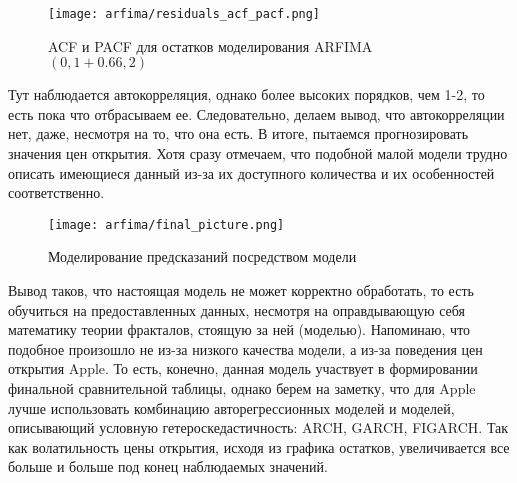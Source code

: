 \begin{enumerate}
	\begin{figure}[H]
		\centering
		\texttt{[image: arfima/residuals\_acf\_pacf.png]}
		\caption{ACF и PACF для остатков моделирования ARFIMA$(0, 1 + 0.66, 2)$}
	\end{figure} 
	\noindent Тут наблюдается автокорреляция, однако более высоких порядков, чем 1-2, то есть пока что отбрасываем ее. Следовательно, делаем вывод, что автокорреляции нет, даже, несмотря на то, что она есть. В итоге, пытаемся прогнозировать значения цен открытия. Хотя сразу отмечаем, что подобной малой модели трудно описать имеющиеся данный из-за их доступного количества и их особенностей соответственно.
	\begin{figure}[H]
		\centering
		\texttt{[image: arfima/final\_picture.png]}
		\caption{Моделирование предсказаний посредством модели}
	\end{figure}
\end{enumerate}
\noindent Вывод таков, что настоящая модель не может корректно обработать, то есть обучиться на предоставленных данных, несмотря на оправдывающую себя математику теории фракталов, стоящую за ней (моделью). Напоминаю, что подобное произошло не из-за низкого качества модели, а из-за поведения цен открытия Apple. То есть, конечно, данная модель участвует в формировании финальной сравнительной таблицы, однако берем на заметку, что для Apple лучше использовать комбинацию авторегрессионных моделей и моделей, описывающий условную гетероскедастичность: ARCH, GARCH, FIGARCH. Так как волатильность цены открытия, исходя из графика остатков, увеличивается все больше и больше под конец наблюдаемых значений.
